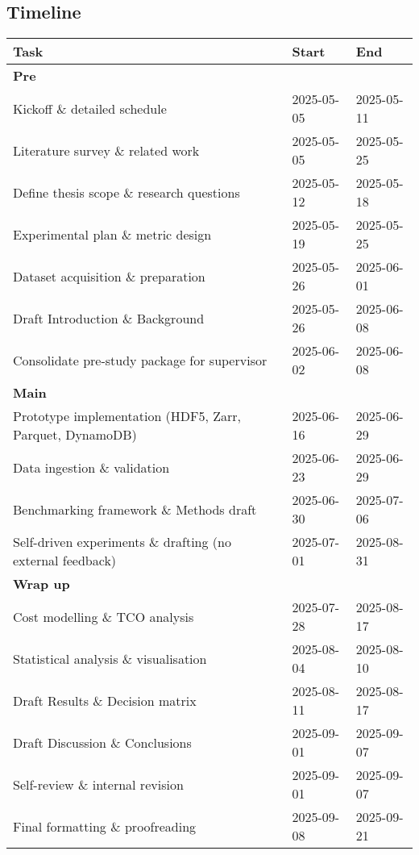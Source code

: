 \documentclass{article}
\begin{document}
\subsection{Timeline}
\begin{center}
    \begingroup
        \setlength{\tabcolsep}{8pt}
        \small
        \begin{tabular}{@{}lll@{}}
            \toprule
            \textbf{Task} & \textbf{Start} & \textbf{End} \\
            \midrule
            \multicolumn{3}{l}{\textbf{Pre}} \\
            Kickoff \& detailed schedule & 2025-05-05 & 2025-05-11 \\
            Literature survey \& related work & 2025-05-05 & 2025-05-25 \\
            Define thesis scope \& research questions & 2025-05-12 & 2025-05-18 \\
            Experimental plan \& metric design & 2025-05-19 & 2025-05-25 \\
            Dataset acquisition \& preparation & 2025-05-26 & 2025-06-01 \\
            Draft Introduction \& Background & 2025-05-26 & 2025-06-08 \\
            Consolidate pre-study package for supervisor & 2025-06-02 & 2025-06-08 \\
            \midrule
            \multicolumn{3}{l}{\textbf{Main}} \\
            Prototype implementation (HDF5, Zarr, Parquet, DynamoDB) & 2025-06-16 & 2025-06-29 \\
            Data ingestion \& validation & 2025-06-23 & 2025-06-29 \\
            Benchmarking framework \& Methods draft & 2025-06-30 & 2025-07-06 \\
            Self-driven experiments \& drafting (no external feedback) & 2025-07-01 & 2025-08-31 \\
            \midrule
            \multicolumn{3}{l}{\textbf{Wrap up}} \\
            Cost modelling \& TCO analysis & 2025-07-28 & 2025-08-17 \\
            Statistical analysis \& visualisation & 2025-08-04 & 2025-08-10 \\
            Draft Results \& Decision matrix & 2025-08-11 & 2025-08-17 \\
            Draft Discussion \& Conclusions & 2025-09-01 & 2025-09-07 \\
            Self-review \& internal revision & 2025-09-01 & 2025-09-07 \\
            Final formatting \& proofreading & 2025-09-08 & 2025-09-21 \\
            \bottomrule
        \end{tabular}
    \endgroup
\end{center}



\printbibliography
\end{document}
